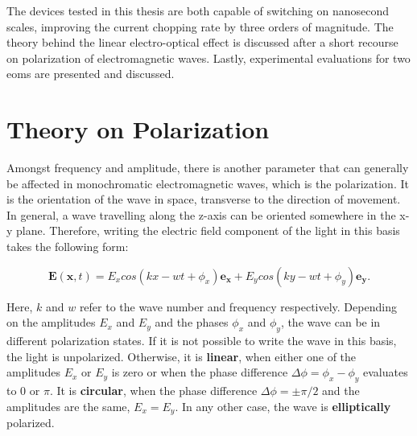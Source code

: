 \begin{figure}[t]
	\label{fig:aom_chopping}
\end{figure}

The devices tested in this thesis are both capable of switching on nanosecond scales, improving the current chopping rate by three orders of magnitude. The theory behind the linear electro-optical effect is discussed after a short recourse on polarization of electromagnetic waves. Lastly, experimental evaluations for two \acp{eom} are presented and discussed.


\section{Theory on Polarization}

\label{sec:pol}

Amongst frequency and amplitude, there is another parameter that can generally be affected in monochromatic electromagnetic waves, which is the polarization. It is the orientation of the wave in space, transverse to the direction of movement.  In general, a wave travelling along the z-axis can be oriented somewhere in the x-y plane. Therefore, writing the electric field component of the light in this basis takes the following form:

\begin{equation}
	\mathbf{E}(\mathbf{x}, t) = E_x cos\left(kx - wt + \phi_x\right) \mathbf{e_x} + E_y cos\left(ky - wt + \phi_y\right) \mathbf{e_y} .
\end{equation}

Here, $k$ and $w$ refer to the wave number and frequency respectively.
Depending on the amplitudes $E_x$ and $E_y$ and the phases $\phi_x$ and $\phi_y$, the wave can be in different polarization states. If it is not possible to write the wave in this basis, the light is unpolarized. Otherwise, it is \textbf{linear}, when either one of the amplitudes $E_x$ or $E_y$ is zero or when the phase difference $\Delta \phi = \phi_x - \phi_y$ evaluates to 0 or $\pi$. It is \textbf{circular}, when the phase difference $\Delta \phi = \pm \pi/2$ and the amplitudes are the same, $E_x = E_y$. In any other case, the wave is \textbf{elliptically} polarized.

